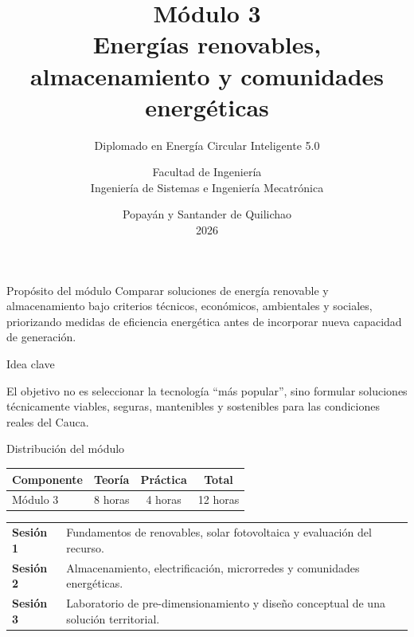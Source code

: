 \documentclass[aspectratio=169,10pt]{beamer}
\title{Módulo 3\\Energías renovables, almacenamiento y comunidades energéticas}
\subtitle{Diplomado en Energía Circular Inteligente 5.0}
\author{Facultad de Ingeniería\\Ingeniería de Sistemas e Ingeniería Mecatrónica}
\institute{Unicomfacauca}
\date{Popayán y Santander de Quilichao\\2026}
\newcommand{\idea}[1]{
\begin{block}{Idea clave}
#1
\end{block}
}
\begin{document}
\begin{frame}
    \titlepage
\end{frame}

\begin{frame}{Propósito del módulo}
\justifying
Comparar soluciones de energía renovable y almacenamiento bajo criterios técnicos, económicos, ambientales y sociales, priorizando medidas de eficiencia energética antes de incorporar nueva capacidad de generación.

\vspace{0.4cm}

\idea{
El objetivo no es seleccionar la tecnología ``más popular'', sino formular soluciones técnicamente viables, seguras, mantenibles y sostenibles para las condiciones reales del Cauca.
}
\end{frame}

\begin{frame}{Distribución del módulo}
\centering
\begin{tabular}{lccc}
\toprule
\textbf{Componente} & \textbf{Teoría} & \textbf{Práctica} & \textbf{Total} \\
\midrule
Módulo 3 & 8 horas & 4 horas & 12 horas \\
\bottomrule
\end{tabular}

\vspace{0.7cm}

\begin{tabular}{p{} p{}}
\textbf{Sesión 1} & Fundamentos de renovables, solar fotovoltaica y evaluación del recurso. \\
\vspace{0.15cm}
\textbf{Sesión 2} & Almacenamiento, electrificación, microrredes y comunidades energéticas. \\
\vspace{0.15cm}
\textbf{Sesión 3} & Laboratorio de pre-dimensionamiento y diseño conceptual de una solución territorial. \\
\end{tabular}
\end{frame}
\end{document}
